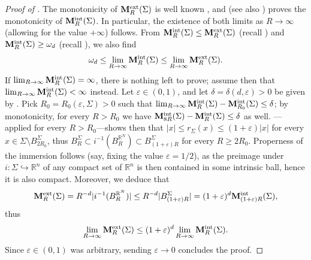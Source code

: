 \documentclass{article}
\newcommand{\eps}{\varepsilon}
\newcommand{\R}{\mathbb{R}}
\newcommand{\ep}{\varepsilon}
\theoremstyle{definition}
\begin{document}
\begin{proof}[Proof of ]
The monotonicity of ${\bf M}_R^{\rm ext}(\Sigma)$ is well known \cite{All72}, and  (see also \cite[Proof of Proposition 2.4]{MP24}) proves the monotonicity of ${\bf M}_R^{\rm int}(\Sigma)$. In particular, the existence of both limits as $R\to\infty$ (allowing for the value $+\infty$) follows. From ${\bf M}_R^{\rm int}(\Sigma)\leq {\bf M}_R^{\rm ext}(\Sigma)$ (recall ) and ${\bf M}_R^{\rm int}(\Sigma)\geq \omega_d$ (recall ), we also find 
$$\omega_d\leq \lim_{R\to\infty} {\bf M}_R^{\rm int}(\Sigma)\leq \lim_{R\to\infty} {\bf M}_R^{\rm ext}(\Sigma).$$
If $\lim_{R\to\infty}{\bf M}_R^{\rm int}(\Sigma)=\infty$, there is nothing left to prove; assume then that $\lim_{R\to \infty} {\bf M}_R^{\rm int}(\Sigma)<\infty$ instead. Let $\eps\in(0,1)$, and let $\delta=\delta(d,\eps)>0$ be given by . Pick $R_0=R_0(\eps,\Sigma)>0$ such that $\lim_{R\to\infty} {\bf M}_{R}^{\rm int}(\Sigma)-{\bf M}_{R_0}^{\rm int}(\Sigma)\leq \delta$; by monotonicity, for every $R>R_0$ we have
${\bf M}_{8R}^{\rm int}(\Sigma)-{\bf M}_{R}^{\rm int}(\Sigma)\leq \delta$ as well. ---applied for
every $R>R_0$---shows then that $|x|\leq r_\Sigma(x)\leq (1+\eps)|x|$ for every $x\in \Sigma\setminus B_{2R_0}^\Sigma$, thus
$B_{R}^\Sigma\subset i^{-1}(B_{R}^{\R^N}) \subset B_{(1+\eps)R}^\Sigma$ for every $R\geq 2R_0$. Properness of the immersion follows (say, fixing the value $\ep=1/2$), as the preimage under $i:\Sigma\hookrightarrow\R^n$ of any compact set of $\R^n$ is then contained in some intrinsic ball, hence it is also compact. Moreover, we deduce that 
$${\bf M}_{R}^{\rm ext}(\Sigma)=R^{-d}|i^{-1}(B_{R}^{\R^N})|\leq R^{-d}|B_{(1+\eps)R}^\Sigma|= (1+\eps)^d{\bf M}_{(1+\eps)R}^{\rm int}(\Sigma),$$
thus
$$\lim_{R\to\infty}{\bf M}_{R}^{\rm ext}(\Sigma)\leq (1+\eps)^d\lim_{R\to\infty}{\bf M}_{R}^{\rm int}(\Sigma).$$
Since $\eps\in(0,1)$ was arbitrary, sending $\eps\to 0$ concludes the proof.
\end{proof}
\end{document}
